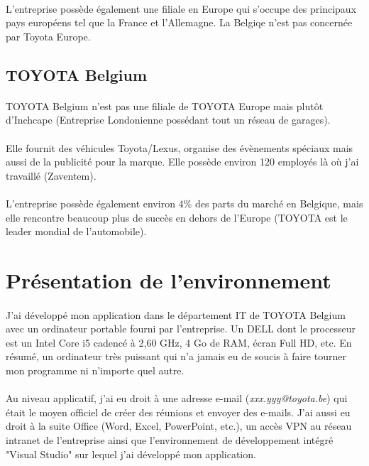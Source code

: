 \documentclass[12pt]{report}
\begin{document}
\paragraph{}
L'entreprise possède également une filiale en Europe qui s'occupe des principaux pays européens tel que la France et l'Allemagne. La Belgiqe n'est pas concernée par Toyota Europe. 

\subsection*{TOYOTA Belgium}
\paragraph{}
TOYOTA Belgium n'est pas une filiale de TOYOTA Europe mais plutôt d'Inchcape (Entreprise Londonienne possédant tout un réseau de garages).

\paragraph{}
Elle fournit des véhicules Toyota/Lexus, organise des évènements spéciaux mais aussi de la publicité pour la marque. Elle possède environ 120 employés là où j'ai travaillé (Zaventem). 

\paragraph{}
L'entreprise possède également environ 4\% des parts du marché en Belgique, mais elle rencontre beaucoup plus de succès en dehors de l'Europe (TOYOTA est le leader mondial de l'automobile).


\section{Présentation de l'environnement}
\paragraph{}
J'ai développé mon application dans le département IT de TOYOTA Belgium avec un ordinateur portable fourni par l'entreprise. Un DELL dont le processeur est un Intel Core i5 cadencé à 2,60 GHz, 4 Go de RAM, écran Full HD, etc. 
En résumé, un ordinateur très puissant qui n'a jamais eu de soucis à faire tourner mon programme ni n'importe quel autre.

\paragraph{}
Au niveau applicatif, j'ai eu droit à une adresse e-mail (\textit{xxx.yyy@toyota.be}) qui était le moyen officiel de créer des réunions et envoyer des e-mails. 
J'ai aussi eu droit à la suite Office (Word, Excel, PowerPoint, etc.), un accès VPN au réseau intranet de l'entreprise ainsi que l'environnement de développement intégré "Visual Studio" sur lequel j'ai développé mon application.
\end{document}
